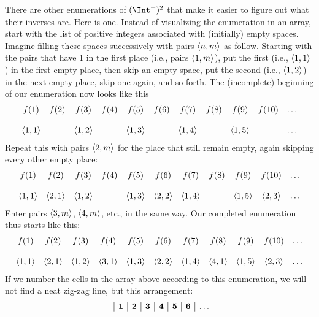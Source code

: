 \documentclass[../../../include/open-logic-section]{subfiles}
\begin{document}
\begin{explain}
There are other enumerations of $(\Int^+)^2$ that make it easier to figure out what their inverses are. Here is one. Instead of visualizing the enumeration in an array, start with the list of positive integers associated with (initially) empty spaces. Imagine filling these spaces successively with pairs $\langle n,m \rangle$ as follow. Starting with the pairs that have 1 in  the first place (i.e., pairs $\langle 1,m \rangle$), put the first (i.e., $\langle 1,1 \rangle$) in the first empty place, then skip an empty space, put the second (i.e., $\langle 1,2 \rangle$) in the next empty place, skip one again, and so forth. The (incomplete) beginning of our enumeration now looks like this
\[
\begin{array}{c c c c c c c c c c c}
f(1) & f(2) & f(3) & f(4) & f(5) & f(6) & f(7) & f(8) & f(9) & f(10) & \dots \\ \\
\tuple{1,1} &  & \tuple{1,2} &  & \tuple{1,3} & & \tuple{1,4} &  & \tuple{1,5} &  & \dots \\
\end{array}
\]
Repeat this with pairs $\langle 2,m \rangle$ for the place that still remain empty, again skipping every other empty place:
\[
\begin{array}{c c c c c c c c c c c}
f(1) & f(2) & f(3) & f(4) & f(5) & f(6) & f(7) & f(8) & f(9) & f(10) & \dots \\ \\
\tuple{1,1} & \tuple{2,1} & \tuple{1,2} &  & \tuple{1,3} & \tuple{2,2} & \tuple{1,4} &  & \tuple{1,5} &  \tuple{2,3} & \dots \\
\end{array}
\]
Enter pairs $\langle 3,m \rangle$, $\langle 4,m \rangle$, etc., in the same way. Our completed enumeration thus starts like this:
\[
\begin{array}{c c c c c c c c c c c}
f(1) & f(2) & f(3) & f(4) & f(5) & f(6) & f(7) & f(8) & f(9) & f(10) & \dots \\ \\
\tuple{1,1} & \tuple{2,1} & \tuple{1,2} & \tuple{3,1}  & \tuple{1,3} & \tuple{2,2} & \tuple{1,4} & \tuple{4,1}  & \tuple{1,5} &  \tuple{2,3} & \dots \\
\end{array}
\]
If we number the cells in the array above according to this enumeration, we will not find a neat zig-zag line, but this arrangement:
\[
\begin{array}{ c | c | c | c | c | c | c | c }
& \textbf 1 & \textbf 2 & \textbf 3 & \textbf 4 & \textbf 5 & \textbf 6 & \dots \\

\end{array}\]
\end{explain}
\end{document}
